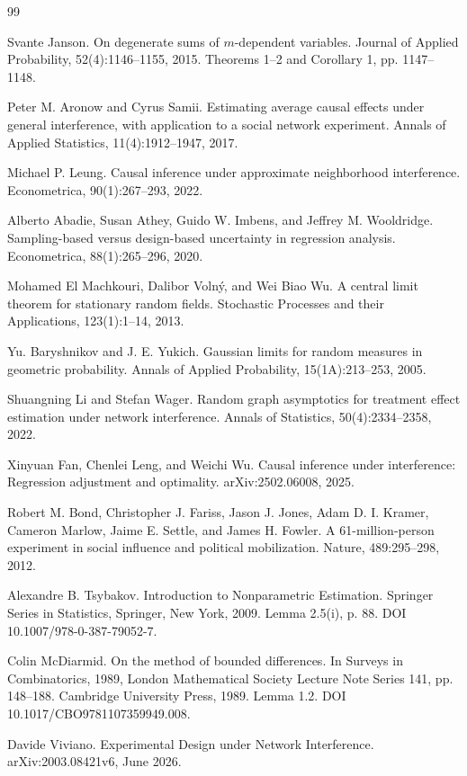 \documentclass{article}
\begin{document}
\begin{thebibliography}{99}

   Svante Janson. On degenerate sums of \(m\)-dependent variables. Journal of Applied Probability, 52(4):1146--1155, 2015. Theorems 1--2 and Corollary 1, pp. 1147--1148.

   Peter M. Aronow and Cyrus Samii. Estimating average causal effects under general interference, with application to a social network experiment. Annals of Applied Statistics, 11(4):1912--1947, 2017.

   Michael P. Leung. Causal inference under approximate neighborhood interference. Econometrica, 90(1):267--293, 2022.

   Alberto Abadie, Susan Athey, Guido W. Imbens, and Jeffrey M. Wooldridge. Sampling-based versus design-based uncertainty in regression analysis. Econometrica, 88(1):265--296, 2020.

   Mohamed El Machkouri, Dalibor Voln\'y, and Wei Biao Wu. A central limit theorem for stationary random fields. Stochastic Processes and their Applications, 123(1):1--14, 2013.

   Yu. Baryshnikov and J. E. Yukich. Gaussian limits for random measures in geometric probability. Annals of Applied Probability, 15(1A):213--253, 2005.

   Shuangning Li and Stefan Wager. Random graph asymptotics for treatment effect estimation under network interference. Annals of Statistics, 50(4):2334--2358, 2022.

   Xinyuan Fan, Chenlei Leng, and Weichi Wu. Causal inference under interference: Regression adjustment and optimality. arXiv:2502.06008, 2025.

   Robert M. Bond, Christopher J. Fariss, Jason J. Jones, Adam D. I. Kramer, Cameron Marlow, Jaime E. Settle, and James H. Fowler. A 61-million-person experiment in social influence and political mobilization. Nature, 489:295--298, 2012.

   Alexandre B. Tsybakov. Introduction to Nonparametric Estimation. Springer Series in Statistics, Springer, New York, 2009. Lemma 2.5(i), p. 88. DOI 10.1007/978-0-387-79052-7.

   Colin McDiarmid. On the method of bounded differences. In Surveys in Combinatorics, 1989, London Mathematical Society Lecture Note Series 141, pp. 148--188. Cambridge University Press, 1989. Lemma 1.2. DOI 10.1017/CBO9781107359949.008.

   Davide Viviano. Experimental Design under Network Interference. arXiv:2003.08421v6, June 2026.

\end{thebibliography}
\end{document}
